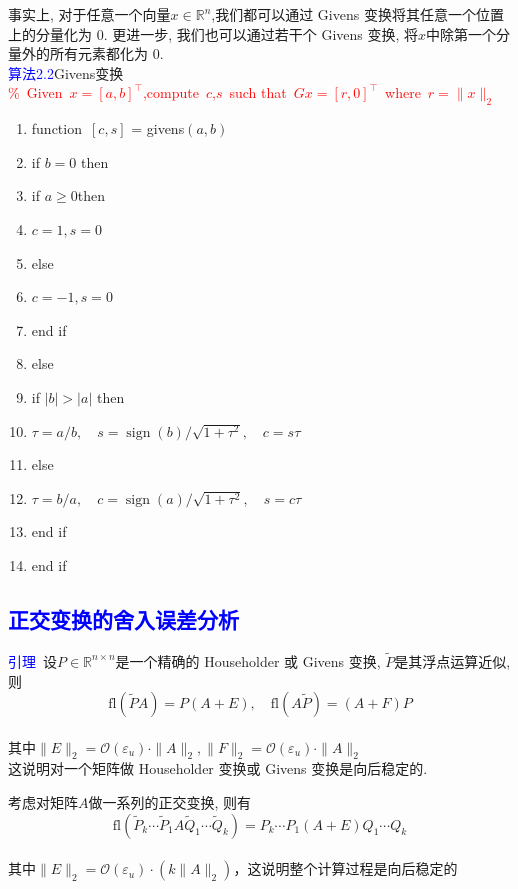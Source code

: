 \documentclass[12pt,a4paper]{article}
\begin{document}
事实上, 对于任意一个向量$x \in \mathbb{R}^n$,我们都可以通过 Givens 变换将其任意一个位置上的分量化为 0. 更进一步, 我们也可以通过若干个 Givens 变换, 将$x$中除第一个分量外的所有元素都化为 0.\\

\noindent \textcolor{blue}{算法2.2}Givens变换\\
\textcolor{red}{\%~Given~$x=[a,b]^{\top}$,compute~$c$,$s$~such that~$Gx=[r,0]^{\top}$~where~$r=\|x\|_2$}
\begin{enumerate}[1:]
	\item function~$[c,s]$ = givens$(a,b)$
	\item if $b=0$ then
    \item \qquad if $a \ge 0$then
    \item \qquad \qquad $c=1,s=0$
    \item \qquad else
    \item \qquad \qquad $c=-1,s=0$
    \item \qquad end if
    \item else
    \item \qquad if $|b|>|a|$ then
    \item \qquad \qquad $\tau=a / b, \quad s=\operatorname{sign}(b) / \sqrt{1+\tau^{2}}, \quad c=s \tau$
    \item \qquad else
    \item \qquad \qquad $\tau=b / a, \quad c=\operatorname{sign}(a) / \sqrt{1+\tau^{2}}, \quad s=c \tau$
    \item \qquad end if
    \item end if  
 \end{enumerate}

\noindent \subsection{\textcolor{blue}{正交变换的舍入误差分析}}
\noindent \textcolor{blue}{引理}~设$P \in \mathbb{R}^{n \times n}$是一个精确的 Householder 或 Givens 变换, $\tilde P$是其浮点运算近似, 则$$
\mathrm{fl}(\tilde{P} A)=P(A+E), \quad \mathrm{fl}(A \tilde{P})=(A+F) P
$$\\
其中$\|E\|_{2}=\mathcal{O}\left(\varepsilon_{u}\right) \cdot\|A\|_{2},\|F\|_{2}=\mathcal{O}\left(\varepsilon_{u}\right) \cdot\|A\|_{2}$\\

\noindent 这说明对一个矩阵做 Householder 变换或 Givens 变换是向后稳定的.

考虑对矩阵$A$做一系列的正交变换, 则有$$
\mathrm{fl}\left(\tilde{P}_{k} \cdots \tilde{P}_{1} A \tilde{Q}_{1} \cdots \tilde{Q}_{k}\right)=P_{k} \cdots P_{1}(A+E) Q_{1} \cdots Q_{k}
$$\\其中$\|E\|_{2}=\mathcal{O}\left(\varepsilon_{u}\right) \cdot\left(k\|A\|_{2}\right)$，这说明整个计算过程是向后稳定的\\
\end{document}
